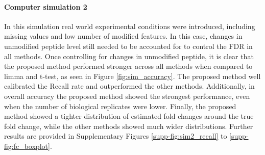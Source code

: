 \documentclass[mcp]{article}
\numberwithin{figure}{section} %
\numberwithin{table}{section}
\def\todo#1{{\color{red}[#1]}}
\begin{document}
\paragraph*{Computer simulation 2} 

In this simulation real world experimental conditions were introduced, including missing values and low number of modified features. In this case, changes in unmodified peptide level still needed to be accounted for to control the FDR in all methods. Once controlling for changes in unmodified peptide, it is clear that the proposed method performed stronger across all methods when compared to limma and t-test, as seen in Figure \ref{fig:sim_accuracy}. The proposed method well calibrated the Recall rate and outperformed the other methods. Additionally, in overall accuracy the proposed method showed the strongest performance, even when the number of biological replicates were lower. Finally, the proposed method showed a tighter distribution of estimated fold changes around the true fold change, while the other methods showed much wider distributions. Further results are provided in Supplementary Figures \ref{supp-fig:sim2_recall} to \ref{supp-fig:fc_boxplot}. 


\end{document}
